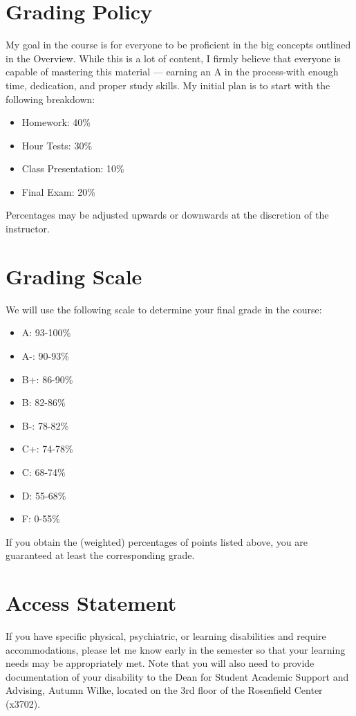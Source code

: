 \documentclass[twoside]{article}
\begin{document}
\section{Grading Policy}
My goal in the course is for everyone to be proficient in the big concepts outlined in the Overview.
While this is a lot of content, I firmly believe that everyone is capable of mastering this material --- earning an A in the process-with enough time, dedication, and proper study skills.
My initial plan is to start with the following breakdown:
\begin{itemize}
\item Homework: 40\%
\item Hour Tests: 30\%
\item Class Presentation: 10\%
\item Final Exam: 20\%
\end{itemize}
Percentages may be adjusted upwards or downwards at the discretion of the instructor. 

\section{Grading Scale}
We will use the following scale to determine your final grade in the course:
\begin{itemize}
\item A: 93-100\%
\item A-: 90-93\%
\item B+: 86-90\%
\item B: 82-86\%
\item B-: 78-82\%
\item C+: 74-78\%
\item C: 68-74\%
\item D: 55-68\%
\item F: 0-55\%
\end{itemize}
If you obtain the (weighted) percentages of points listed above, you are guaranteed at least the corresponding grade. %

\section{Access Statement}
If you have specific physical, psychiatric, or learning disabilities and require accommodations, please let me know early in the semester so that your learning needs may be appropriately met. Note that you will also need to provide documentation of your disability to the Dean for Student Academic Support and Advising, Autumn Wilke, located on the 3rd floor of the Rosenfield Center (x3702).
\end{document}
